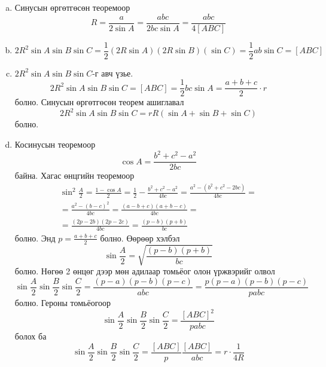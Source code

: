 \documentclass[10pt,a4paper,oneside]{book}
\begin{document}
\TheSolution
\begin{enumerate}[(a)]
\item
Синусын өргөтгөсөн теоремоор
\begin{equation*}
R= \frac{a}{2\sin A} = \frac{abc}{2bc\sin A} = \frac{abc}{4[ABC]}
\end{equation*}
\item
\begin{equation*}
2R^2\sin A\sin B\sin C = \frac{1}{2}(2R\sin A)(2R\sin B)(\sin C) = \frac{1}{2}ab\sin C = [ABC]
\end{equation*}
\item
$2R^2\sin A\sin B\sin C$-г авч үзье.
\begin{equation*}
2R^2\sin A \sin B\sin C = [ABC] = \frac{1}{2}bc\sin A = \frac{a+b+c}{2}\cdot r
\end{equation*}
болно. Синусын өргөтгөсөн теорем ашиглавал
\begin{equation*}
2R^2\sin A\sin B\sin C = rR(\sin A + \sin B + \sin C)
\end{equation*}
болно.
\item
Косинусын теоремоор
\begin{equation*}
\cos A = \frac{b^2+c^2-a^2}{2bc}
\end{equation*}
байна. Хагас өнцгийн теоремоор
\begin{align*}
\sin^2 \frac{A}{2} = \frac{1-\cos A}{2} = \frac{1}{2} - \frac{b^2 + c^2 -a^2}{4bc} = \frac{a^2-(b^2+c^2-2bc)}{4bc} =\\
= \frac{a^2 -(b-c)^2}{4bc} = \frac{(a-b+c)(a+b-c)}{4bc} = \\
= \frac{(2p-2b)(2p-2c)}{4bc} = \frac{(p-b)(p+b)}{bc}
\end{align*}
болно. Энд $p=\frac{a+b+c}{2}$ болно. Өөрөөр хэлбэл
\begin{equation*}
\sin \frac{A}{2} = \sqrt{\frac{(p-b)(p+b)}{bc}}
\end{equation*}
болно. Нөгөө 2 өнцөг дээр мөн адилаар томьёог олон үржвэрийг олвол
\begin{equation*}
\sin \frac{A}{2}\sin \frac{B}{2} \sin \frac{C}{2} = \frac{(p-a)(p-b)(p-c)}{abc} = \frac{p(p-a)(p-b)(p-c)}{pabc}
\end{equation*}
болно. Героны томьёогоор
\begin{equation*}
\sin \frac{A}{2}\sin \frac{B}{2} \sin \frac{C}{2} = \frac{[ABC]^2}{pabc}
\end{equation*}
болох ба
\begin{equation*}
\sin \frac{A}{2}\sin \frac{B}{2} \sin \frac{C}{2} = \frac{[ABC]}{p}\frac{[ABC]}{abc} = r\cdot \frac{1}{4R}

\end{equation*}
\end{enumerate}
\end{document}
